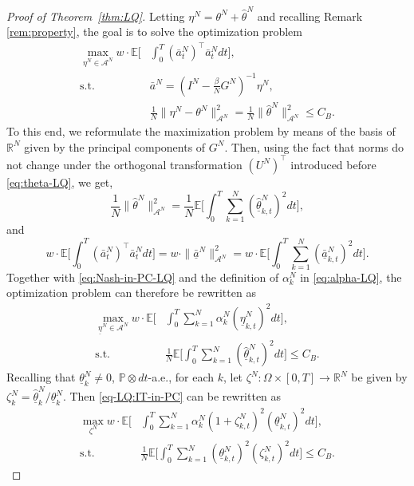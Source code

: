 \documentclass[11pt]{article}
\def\al{\alpha}
\def\P{\mathbb{P}}
\def\E{{\mathbb{E}}}
\newcommand{\R}{{\mathbb R}}
\newcommand{\be}{\begin{equation}}
\newcommand{\ee}{\end{equation}}
\numberwithin{equation}{section}
\begin{document}
\begin{proof}[Proof of Theorem~\ref{thm:LQ}]
Letting $\eta^N=\theta^N+\hat\theta^N$ and recalling Remark \ref{rem:property}, the goal is to solve the optimization problem
    \be\begin{aligned}
\max_{\eta^N\in\mathcal{A}^N}w\cdot \E\bigg[&\int_0^T (\bar{a}^N_t)^\top\bar{a}^N_tdt\bigg],\\
\textrm{s.t.}\quad & \bar{a}^N=(I^N-\frac{\beta}{N}G^N)^{-1}\eta^N,\\
    & \frac{1}{N}\|\eta^N-\theta^N\|^2_{\mathcal{A}^N}=\frac{1}{N}\|\hat{\theta}^N\|^2_{\mathcal{A}^N}\leq C_B.
\end{aligned}\ee
To this end, we reformulate the maximization problem by means of the basis of $\R^N$ given by the principal components of $G^N$. Then, using the fact that norms do not change under the orthogonal transformation $(U^N)^\top$ introduced before \eqref{eq:theta-LQ}, we get, 
$$
\frac{1}{N}\|\hat\theta^N\|_{\mathcal{A}^N}^2=\frac{1}{N}\E\bigg[\int_0^T\sum_{k=1}^N (\hat{\underline{\theta}}^N_{k,t})^2dt\bigg],
$$
and
$$
w\cdot \E\bigg[\int_0^T (\bar{a}^N_t)^\top\bar{a}^N_tdt\bigg]=w\cdot \|\underline{\bar{a}}^N\|_{\mathcal{A}^N}^2=w\cdot\E\bigg[\int_0^T\sum_{k=1}^N (\bar{\underline{a}}^N_{k,t})^2dt\bigg].
$$
Together with \eqref{eq:Nash-in-PC-LQ} and the definition of $\al^N_k$ in \eqref{eq:alpha-LQ}, the optimization problem can therefore be rewritten as 
\be\begin{aligned}\label{eq-LQ:IT-in-PC}
\max_{\underline{\eta}^N\in\mathcal{A}^N}w\cdot \E\bigg[&\int_0^T \sum_{k=1}^N\al^N_k(\underline{\eta}^N_{k,t})^2dt\bigg],\\
\textrm{s.t.}\quad
    &\frac{1}{N}\E\bigg[\int_0^T\sum_{k=1}^N (\hat{\underline{\theta}}^N_{k,t})^2dt\bigg]\leq C_B.
\end{aligned}\ee
Recalling that $\underline{\theta}^N_k\neq 0$, $\P \otimes dt$-a.e., for each $k$, let $\zeta^N:\Omega\times[0,T]\to\R^N$ be given by $\zeta^N_k=\underline{\hat\theta}^N_k / \underline{\theta}^N_k$. Then \eqref{eq-LQ:IT-in-PC} can be rewritten as
\be\begin{aligned}\label{eq-LQ:IT-with-x}
\max_{\zeta^N}w\cdot \E\bigg[&\int_0^T \sum_{k=1}^N\al^N_k(1+\zeta^N_{k,t})^2(\underline{\theta}_{k,t}^N)^2dt\bigg],\\
\textrm{s.t.}\quad
    &\frac{1}{N}\E\bigg[\int_0^T\sum_{k=1}^N (\underline{\theta}_{k,t}^N)^2(\zeta^N_{k,t})^2dt\bigg]\leq C_B.
\end{aligned}\ee

\end{proof}
\end{document}
